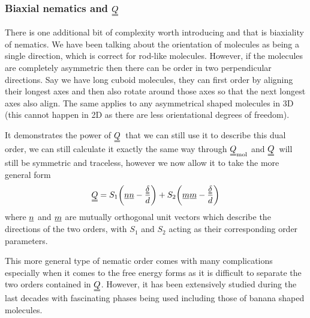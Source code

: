 \documentclass[12pt]{article}
\newcommand{\suf}[2]{\stackunder[0.5pt]{\stackunder[1pt]{\ensuremath{#1}}{\rule{\widthof{\ensuremath{#2}}*\real{0.9}}{.1ex}}}{}}
\newcommand{\duf}[2]{\stackunder[0.5pt]{\stackunder[0.8pt]{\stackunder[1pt]{\ensuremath{#1}}{\rule{\widthof{\ensuremath{#2}}*\real{0.9}}{.1ex}}}{\rule{\widthof{\ensuremath{#2}}*\real{0.9}}{.1ex}}}{}}
\newcommand{\su}[1]{\suf{#1}{#1}}
\newcommand{\du}[1]{\duf{#1}{#1}}
\newcommand{\QQ}{\ensuremath{\du{Q}}}
\newcommand{\dudelta}{\ensuremath{\du{\delta}}}
\begin{document}
        \subsubsection{Biaxial nematics and \QQ}\label{sec:intro_Q_biax}
        There is one additional bit of complexity worth introducing and that is biaxiality of nematics.
        We have been talking about the orientation of molecules as being a single direction, which is correct for rod-like molecules.
        However, if the molecules are completely asymmetric then there can be order in two perpendicular directions.
        Say we have long cuboid molecules, they can first order by aligning their longest axes and then also rotate around those axes so that the next longest axes also align.
        The same applies to any asymmetrical shaped molecules in 3D (this cannot happen in 2D as there are less orientational degrees of freedom).

        It demonstrates the power of \QQ\ that we can still use it to describe this dual order, we can still calculate it exactly the same way through $\du{Q}_\text{mol}$ and \QQ\ will still be symmetric and traceless, however we now allow it to take the more general form
        \begin{equation}\label{eq:Qbiax}
            \du{Q} = S_1\qty(\su{n} \su{n} - \frac{\dudelta}{d}) + S_2\qty(\su{m} \su{m} - \frac{\dudelta}{d})
        \end{equation}
        where $\su{n}$ and $\su{m}$ are mutually orthogonal unit vectors which describe the directions of the two orders, with $S_1$ and $S_2$ acting as their corresponding order parameters.

        This more general type of nematic order comes with many complications especially when it comes to the free energy forms as it is difficult to separate the two orders contained in \QQ.
        However, it has been extensively studied during the last decades with fascinating phases being used including those of banana shaped molecules\cite{luckhurstBiaxialNematicLiquid2015,kumarBiaxialityNematicSmectic2017,kimCurvaturesSmecticLiquid2018}.
\end{document}

